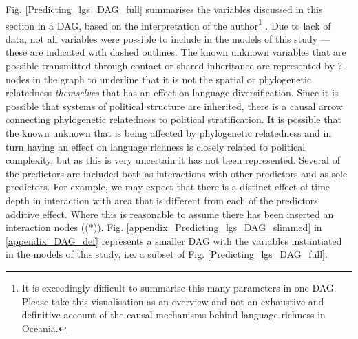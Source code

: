 \documentclass[unnumsec,webpdf,modern,medium]{oup-authoring-template}
\providecommand{\DIFaddtex}[1]{{\protect\color{blue} \sf #1}} %
\providecommand{\DIFaddbegin}{} %
\providecommand{\DIFaddend}{} %
\providecommand{\DIFdelbegin}{} %
\providecommand{\DIFdelend}{} %
\providecommand{\DIFadd}[1]{\texorpdfstring{\DIFaddtex{#1}}{#1}} %
\newcommand{\DIFscaledelfig}{0.5}
\newlength{\DIFdelgraphicswidth} %
\newlength{\DIFdelgraphicsheight} %
\newcommand{\DIFaddincludegraphics}[2][]{{\color{blue}\fbox{\DIFOincludegraphics[#1]{#2}}}} %
\newcommand{\DIFdelincludegraphics}[2][]{%
\sbox{\DIFdelgraphicsbox}{\DIFOincludegraphics[#1]{#2}}%
\settoboxwidth{\DIFdelgraphicswidth}{\DIFdelgraphicsbox} %
\settoboxtotalheight{\DIFdelgraphicsheight}{\DIFdelgraphicsbox} %
\scalebox{\DIFscaledelfig}{%
\parbox[b]{\DIFdelgraphicswidth}{\usebox{\DIFdelgraphicsbox}\\[-\baselineskip] \rule{\DIFdelgraphicswidth}{0em}}\llap{\resizebox{\DIFdelgraphicswidth}{\DIFdelgraphicsheight}{%
\setlength{\unitlength}{\DIFdelgraphicswidth}%
\begin{picture}(1,1)%
\thicklines\linethickness{2pt} %
{\color[rgb]{1,0,0}\put(0,0){\framebox(1,1){}}}%
{\color[rgb]{1,0,0}\put(0,0){\line( 1,1){1}}}%
{\color[rgb]{1,0,0}\put(0,1){\line(1,-1){1}}}%
\end{picture}%
}\hspace*{3pt}}} %
} %
\DeclareRobustCommand{\DIFaddbegin}{\DIFOaddbegin \let\includegraphics\DIFaddincludegraphics} %
\DeclareRobustCommand{\DIFaddend}{\DIFOaddend \let\includegraphics\DIFOincludegraphics} %
\DeclareRobustCommand{\DIFdelbegin}{\DIFOdelbegin \let\includegraphics\DIFdelincludegraphics} %
\DeclareRobustCommand{\DIFdelend}{\DIFOaddend \let\includegraphics\DIFOincludegraphics} %
\begin{document}
\DIFdelbegin %
\DIFdelend \DIFaddbegin \DIFadd{Fig. \ref{Predicting_lgs_DAG_full} summarises the variables discussed in this section in a DAG, based on the interpretation of the author}\footnote{\DIFadd{It is exceedingly difficult to summarise this many parameters in one DAG. Please take this visualisation as an overview and not an exhaustive and definitive account of the causal mechanisms behind language richness in Oceania.}}\DIFadd{. Due to lack of data, not all variables were possible to include in the models of this study --- these are indicated with dashed outlines. The known unknown variables that are possible transmitted through contact or shared inheritance are represented by ?-nodes in the graph to underline that it is not the spatial or phylogenetic relatedness \emph{themselves} that has an effect on language diversification. Since it is possible that systems of political structure are inherited, there is a causal arrow connecting phylogenetic relatedness to political stratification. It is possible that the known unknown that is being affected by phylogenetic relatedness and in turn having an effect on language richness is closely related to political complexity, but as this is very uncertain it has not been represented. Several of the predictors are included both as interactions with other predictors and as sole predictors. For example, we may expect that there is a distinct effect of time depth in interaction with area that is different from each of the predictors additive effect. Where this is reasonable to assume there has been inserted an interaction nodes (($\ast$)). Fig. \ref{appendix_Predicting_lgs_DAG_slimmed} in \ref{appendix_DAG_def} represents a smaller DAG with the variables instantiated in the models of this study, i.e. a subset of Fig. \ref{Predicting_lgs_DAG_full}.
}\DIFaddend 
\end{document}

